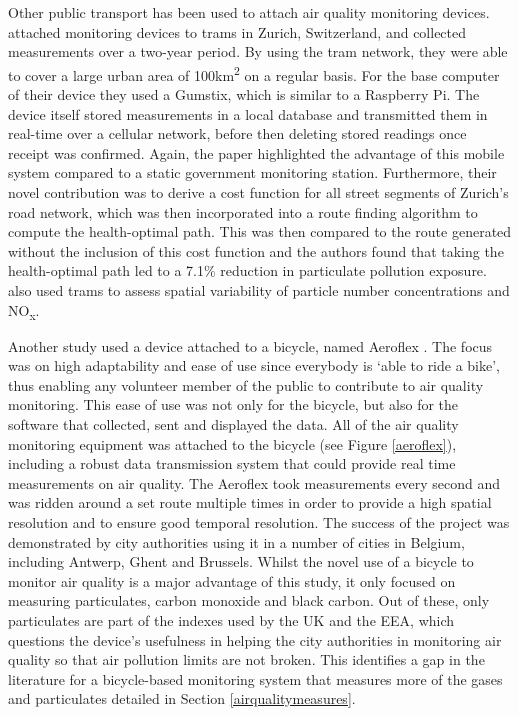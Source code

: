 \documentclass[11pt]{report}
\begin{document}

Other public transport has been used to attach air quality monitoring devices. \cite{Hasenfratz2015highresmapsTram} attached monitoring devices to trams in Zurich, Switzerland, and collected measurements over a two-year period. By using the tram network, they were able to cover a large urban area of 100km\textsuperscript{2} on a regular basis. For the base computer of their device they used a Gumstix, which is similar to a Raspberry Pi.  The device itself stored measurements in a local database and transmitted them in real-time over a cellular network, before then deleting stored readings once receipt was confirmed. Again, the paper highlighted the advantage of this mobile system compared to a static government monitoring station. Furthermore, their novel contribution was to derive a cost function for all street segments of Zurich's road network, which was then incorporated into a route finding algorithm to compute the health-optimal path. This was then compared to the route generated without the inclusion of this cost function and the authors found that taking the health-optimal path led to a 7.1\% reduction in particulate pollution exposure. \cite{Hagemann2014aerotram} also used trams to assess spatial variability of particle number concentrations and NO\textsubscript{x}.

Another study used a device attached to a bicycle, named Aeroflex \citep{Elen2013aeroflex}. The focus was on high adaptability and ease of use since everybody is `able to ride a bike', thus enabling any volunteer member of the public to contribute to air quality monitoring. This ease of use was not only for the bicycle, but also for the software that collected, sent and displayed the data. All of the air quality monitoring equipment was attached to the bicycle (see Figure \ref{aeroflex}), including a robust data transmission system that could provide real time measurements on air quality. The Aeroflex took measurements every second and was ridden around a set route multiple times in order to provide a high spatial resolution and to ensure good temporal resolution. The success of the project was demonstrated by city authorities using it in a number of cities in Belgium, including Antwerp, Ghent and Brussels. Whilst the novel use of a bicycle to monitor air quality is a major advantage of this study, it only focused on measuring particulates, carbon monoxide and black carbon. Out of these, only particulates are part of the indexes used by the UK and the EEA, which questions the device's usefulness in helping the city authorities in monitoring air quality so that air pollution limits are not broken. This identifies a gap in the literature for a bicycle-based monitoring system that measures more of the gases and particulates detailed in Section \ref{airqualitymeasures}.
\end{document}
